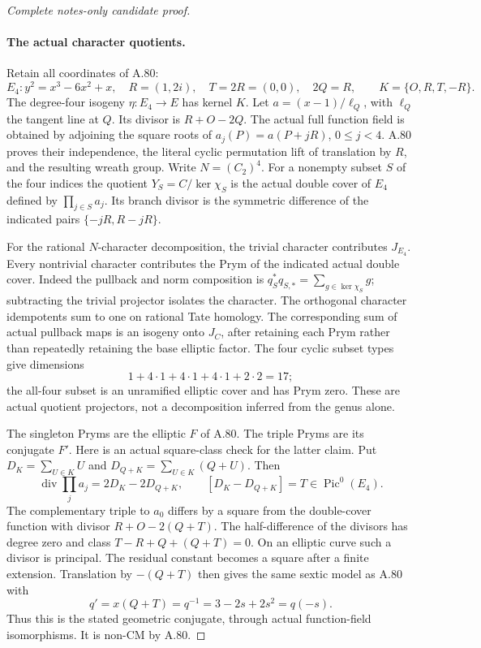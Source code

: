 \begin{proof}[Complete notes-only candidate proof]
\paragraph{The actual character quotients.}
Retain all coordinates of A.80:
\[
 E_4:y^2=x^3-6x^2+x,\quad
 R=(1,2i),\quad T=2R=(0,0),\quad 2Q=R,
 \qquad K=\{O,R,T,-R\}.
\]
The degree-four isogeny \(\eta:E_4\to E\) has kernel \(K\).
Let \(a=(x-1)/\ell_Q\), with \(\ell_Q\) the tangent line
at \(Q\). Its divisor is \(R+O-2Q\).
The actual full function field is obtained by adjoining the square
roots of \(a_j(P)=a(P+jR)\), \(0\le j<4\).
A.80 proves their independence, the literal cyclic permutation
lift of translation by \(R\), and the resulting wreath group.
Write \(N=(C_2)^4\). For a nonempty subset \(S\) of the four
indices the quotient \(Y_S=C/\ker\chi_S\) is the actual double
cover of \(E_4\) defined by \(\prod_{j\in S}a_j\).
Its branch divisor is the symmetric difference of the indicated
pairs \(\{-jR,R-jR\}\).

For the rational \(N\)-character decomposition, the trivial
character contributes \(J_{E_4}\). Every nontrivial character
contributes the Prym of the indicated actual double cover.
Indeed the pullback and norm composition is
\(q_S^*q_{S,*}=\sum_{g\in\ker\chi_S}g\); subtracting the
trivial projector isolates the character. The orthogonal character
idempotents sum to one on rational Tate homology. The corresponding
sum of actual pullback maps is an isogeny onto \(J_C\), after
retaining each Prym rather than repeatedly retaining the base
elliptic factor. The four cyclic subset types give dimensions
\[
 1+4\cdot1+4\cdot1+4\cdot1+2\cdot2=17;              \tag{A.82.2}
\]
the all-four subset is an unramified elliptic cover and has Prym
zero. These are actual quotient projectors, not a decomposition
inferred from the genus alone.

The singleton Pryms are the elliptic \(F\) of A.80. The triple
Pryms are its conjugate \(F'\). Here is an actual square-class
check for the latter claim. Put \(D_K=\sum_{U\in K}U\) and
\(D_{Q+K}=\sum_{U\in K}(Q+U)\). Then
\[
 \operatorname{div}\prod_j a_j=2D_K-2D_{Q+K},
 \qquad [D_K-D_{Q+K}]=T\in\operatorname{Pic}^0(E_4).
                                                               \tag{A.82.3}
\]
The complementary triple to \(a_0\) differs by a square from
the double-cover function with divisor \(R+O-2(Q+T)\).
The half-difference of the divisors has degree zero and class
\(T-R+Q+(Q+T)=0\). On an elliptic curve such a divisor is
principal. The residual constant becomes a square after a finite
extension. Translation by \(-(Q+T)\) then gives the same
sextic model as A.80 with
\[
 q'=x(Q+T)=q^{-1}=3-2s+2s^2=q(-s).                    \tag{A.82.4}
\]
Thus this is the stated geometric conjugate, through actual
function-field isomorphisms. It is non-CM by A.80.


\end{proof}
